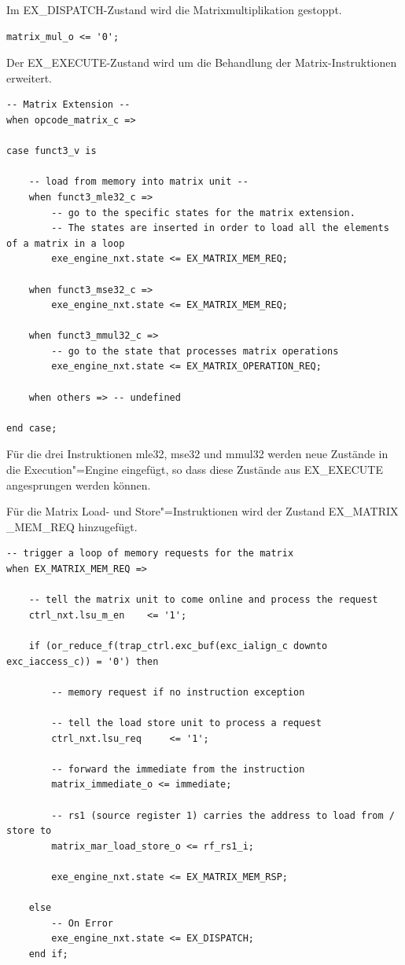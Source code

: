 Im EX\_DISPATCH-Zustand wird die Matrixmultiplikation gestoppt.

\begin{lstlisting}[style=VHDLStyle,caption={Matrixmultiplikation beenden},captionpos=b]
matrix_mul_o <= '0';
\end{lstlisting}

Der EX\_EXECUTE-Zustand wird um die Behandlung der Matrix-Instruktionen erweitert.

\begin{lstlisting}[style=VHDLStyle,caption={Erweiterung des EX\_EXECUTE Zustands},captionpos=b]
-- Matrix Extension --
when opcode_matrix_c =>

case funct3_v is

    -- load from memory into matrix unit --
    when funct3_mle32_c =>
        -- go to the specific states for the matrix extension.
        -- The states are inserted in order to load all the elements of a matrix in a loop
        exe_engine_nxt.state <= EX_MATRIX_MEM_REQ;

    when funct3_mse32_c =>
        exe_engine_nxt.state <= EX_MATRIX_MEM_REQ;

    when funct3_mmul32_c =>
        -- go to the state that processes matrix operations
        exe_engine_nxt.state <= EX_MATRIX_OPERATION_REQ;

    when others => -- undefined

end case;
\end{lstlisting}

Für die drei Instruktionen mle32, mse32 und mmul32 werden neue Zustände in die Execution"=Engine eingefügt, so dass diese Zustände aus EX\_EXECUTE angesprungen werden können.

Für die Matrix Load- und Store"=Instruktionen wird der Zustand EX\_MATRIX \_MEM\_REQ hinzugefügt.

\begin{lstlisting}[style=VHDLStyle,caption={Erweiterung des EX\_MATRIX\_MEM\_REQ Zustands},captionpos=b]
-- trigger a loop of memory requests for the matrix
when EX_MATRIX_MEM_REQ =>

    -- tell the matrix unit to come online and process the request
    ctrl_nxt.lsu_m_en    <= '1';

    if (or_reduce_f(trap_ctrl.exc_buf(exc_ialign_c downto exc_iaccess_c)) = '0') then

        -- memory request if no instruction exception

        -- tell the load store unit to process a request
        ctrl_nxt.lsu_req     <= '1';

        -- forward the immediate from the instruction
        matrix_immediate_o <= immediate;

        -- rs1 (source register 1) carries the address to load from / store to
        matrix_mar_load_store_o <= rf_rs1_i;

        exe_engine_nxt.state <= EX_MATRIX_MEM_RSP;

    else
        -- On Error
        exe_engine_nxt.state <= EX_DISPATCH;
    end if;
\end{lstlisting}


